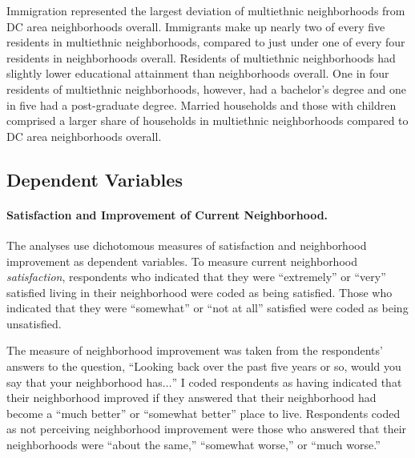 \documentclass{baderart}
\begin{document}

Immigration represented the largest deviation of multiethnic neighborhoods from DC area neighborhoods overall. Immigrants make up nearly two of every five residents in multiethnic neighborhoods, compared to just under one of every four residents in neighborhoods overall. Residents of multiethnic neighborhoods had slightly lower educational attainment than neighborhoods overall. One in four residents of multiethnic neighborhoods, however, had a bachelor's degree and one in five had a post-graduate degree. Married households and those with children comprised a larger share of households in multiethnic neighborhoods compared to DC area neighborhoods overall.


\subsection{Dependent Variables}\label{dependent-variables}

\paragraph{Satisfaction and Improvement of Current Neighborhood.}
The analyses use dichotomous measures of satisfaction and neighborhood improvement as dependent variables. To measure current neighborhood \emph{satisfaction}, respondents who indicated that they were ``extremely'' or ``very'' satisfied living in their neighborhood were coded as being satisfied. Those who indicated that they were ``somewhat'' or ``not at all'' satisfied were coded as being unsatisfied.

The measure of neighborhood improvement was taken from the respondents' answers to the question, ``Looking back over the past five years or so, would you say that your neighborhood has\(\ldots\)'' I coded respondents as having indicated that their neighborhood improved if they answered that their neighborhood had become a ``much better'' or ``somewhat better'' place to live. Respondents coded as not perceiving neighborhood improvement were those who answered that their neighborhoods were ``about the same,'' ``somewhat worse,'' or ``much worse.''
\end{document}
